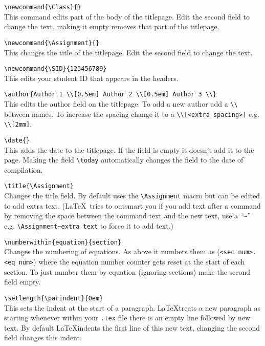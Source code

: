 \documentclass[a4paper, 12pt, english]{article}
\begin{document}
            \verb+\newcommand{\Class}{}+\\
            This command edits part of the body of the titlepage. Edit the second field to change the text, making it empty removes that part of the titlepage.

            \verb+\newcommand{\Assignment}{}+\\
            This changes the title of the titlepage. Edit the second field to change the text.

            \verb+\newcommand{\SID}{123456789}+\\
            This edits your student ID that appears in the headers.

            \verb+\author{Author 1 \\[0.5em] Author 2 \\[0.5em] Author 3 \\}+\\
            This edits the author field on the titlepage. To add a new author add a \verb+\\+ between names. To increase the spacing change it to a \verb+\\[<extra spacing>]+ e.g. \verb+\\[2mm]+.

            \verb+\date{}+\\
            This adds the date to the titlepage. If the field is empty it doesn't add it to the page. Making the field \verb+\today+ automatically changes the field to the date of compilation.

            \newpage

            \verb+\title{\Assignment}+\\
            Changes the title field. By default uses the \verb+\Assignment+ macro but can be edited to add extra text. (\LaTeX~tries to outsmart you if you add text after a command by removing the space between the command text and the new text, use a ``\verb+~+'' e.g. \verb+\Assignment~extra text+ to force it to add text.)

            \verb+\numberwithin{equation}{section}+\\
            Changes the numbering of equations. As above it numbers them as (\verb+<sec num>.<eq num>+) where the equation number counter gets reset at the start of each section. To just number them by equation (ignoring sections) make the second field empty.

            \verb+\setlength{\parindent}{0em}+\\
            This sets the indent at the start of a paragraph. \LaTeX treats a new paragraph as starting whenever within your \verb+.tex+ file there is an empty line followed by new text. By default \LaTeX indents the first line of this new text, changing the second field changes this indent.
\end{document}
